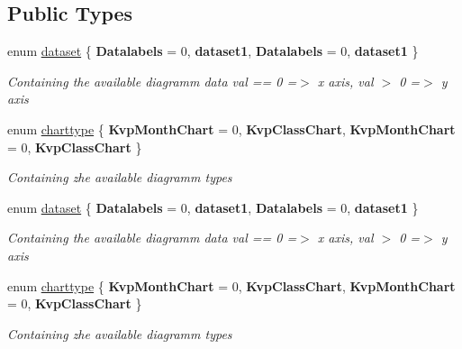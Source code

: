 \subsection*{Public Types}
\begin{DoxyCompactItemize}
\item 
enum \hyperlink{classkpi_mvc_api_1_1_data_transfer_objects_1_1_kvp_data_dto_rs_aec5ef29d115053aa1f78d15adc7e1373}{dataset} \{ {\bfseries Datalabels} = 0, 
{\bfseries dataset1}, 
{\bfseries Datalabels} = 0, 
{\bfseries dataset1}
 \}\begin{DoxyCompactList}\small\item\em Containing the available diagramm data val == 0 =$>$ x axis, val $>$ 0 =$>$ y axis \end{DoxyCompactList}
\item 
enum \hyperlink{classkpi_mvc_api_1_1_data_transfer_objects_1_1_kvp_data_dto_rs_a829c595d537885ae923de884be501246}{charttype} \{ {\bfseries Kvp\+Month\+Chart} = 0, 
{\bfseries Kvp\+Class\+Chart}, 
{\bfseries Kvp\+Month\+Chart} = 0, 
{\bfseries Kvp\+Class\+Chart}
 \}\begin{DoxyCompactList}\small\item\em Containing zhe available diagramm types \end{DoxyCompactList}
\item 
enum \hyperlink{classkpi_mvc_api_1_1_data_transfer_objects_1_1_kvp_data_dto_rs_aec5ef29d115053aa1f78d15adc7e1373}{dataset} \{ {\bfseries Datalabels} = 0, 
{\bfseries dataset1}, 
{\bfseries Datalabels} = 0, 
{\bfseries dataset1}
 \}\begin{DoxyCompactList}\small\item\em Containing the available diagramm data val == 0 =$>$ x axis, val $>$ 0 =$>$ y axis \end{DoxyCompactList}
\item 
enum \hyperlink{classkpi_mvc_api_1_1_data_transfer_objects_1_1_kvp_data_dto_rs_a829c595d537885ae923de884be501246}{charttype} \{ {\bfseries Kvp\+Month\+Chart} = 0, 
{\bfseries Kvp\+Class\+Chart}, 
{\bfseries Kvp\+Month\+Chart} = 0, 
{\bfseries Kvp\+Class\+Chart}
 \}\begin{DoxyCompactList}\small\item\em Containing zhe available diagramm types \end{DoxyCompactList}
\end{DoxyCompactItemize}
